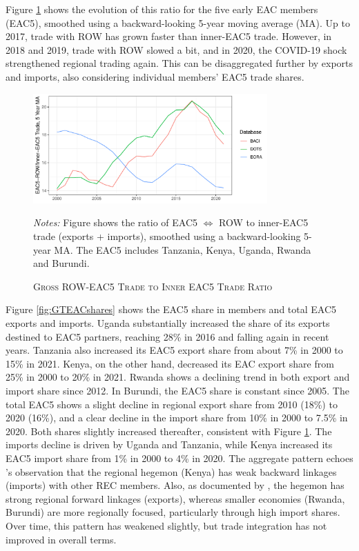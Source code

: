 \documentclass[a4paper]{article}
\begin{document}
Figure \ref{fig:EAC_ROW_Ratios} shows the evolution of this ratio for the five early EAC members (EAC5), smoothed using a backward-looking 5-year moving average (MA). Up to 2017, trade with ROW has grown faster than inner-EAC5 trade. However, in 2018 and 2019, trade with ROW slowed a bit, and in 2020, the COVID-19 shock strengthened regional trading again. This can be disaggregated further by exports and imports, also considering individual members' EAC5 trade shares. \newline 

\begin{figure}[h!] 
\centering
\caption{\label{fig:EAC_ROW_Ratios} \textsc{Gross ROW-EAC5 Trade to Inner EAC5 Trade Ratio}}
\vspace{2mm}
\includegraphics[width = 0.8\textwidth]{"Figures/ROW_EAC5_Trade_Ratios_5YMA.pdf"} \\
\raggedright
\scriptsize 
\emph{Notes:} Figure shows the ratio of EAC5 $\Leftrightarrow$ ROW to inner-EAC5 trade (exports + imports), smoothed using a backward-looking 5-year MA. The EAC5 includes Tanzania, Kenya, Uganda, Rwanda and Burundi.
\end{figure}
\FloatBarrier


Figure \ref{fig:GTEACshares} shows the EAC5 share in members and total EAC5 exports and imports. Uganda substantially increased the share of its exports destined to EAC5 partners, reaching 28\% in 2016 and falling again in recent years. Tanzania also increased its EAC5 export share from about 7\% in 2000 to 15\% in 2021. Kenya, on the other hand, decreased its EAC export share from 25\% in 2000 to 20\% in 2021. Rwanda shows a declining trend in both export and import share since 2012. In Burundi, the EAC5 share is constant since 2005. The total EAC5 shows a slight decline in regional export share from 2010 (18\%) to 2020 (16\%), and a clear decline in the import share from 10\% in 2000 to 7.5\% in 2020. Both shares slightly increased thereafter, consistent with Figure \ref{fig:EAC_ROW_Ratios}. The imports decline is driven by Uganda and Tanzania, while Kenya increased its EAC5 import share from 1\% in 2000 to 4\% in 2020. The aggregate pattern echoes \citet{obasaju2021regional}'s observation that the regional hegemon (Kenya) has weak backward linkages (imports) with other REC members. Also, as documented by \citet{engel2016sacu}, the hegemon has strong regional forward linkages (exports), whereas smaller economies (Rwanda, Burundi) are more regionally focused, particularly through high import shares. Over time, this pattern has weakened slightly, but trade integration has not improved in overall terms. 
\end{document}
